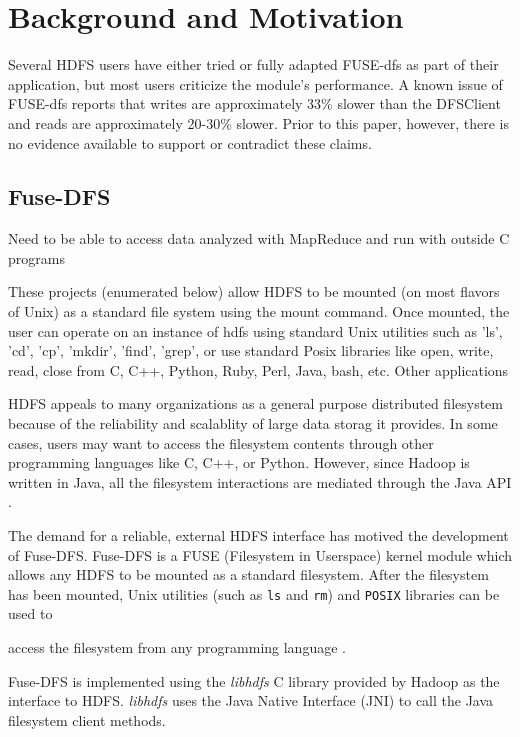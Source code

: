 \documentclass[11]{article}
\begin{document}
\section{Background and Motivation}
Several HDFS users have either tried or fully adapted FUSE-dfs as part
of their application, but most users criticize the module's performance.   
A known issue of FUSE-dfs reports that writes are approximately 33\% 
slower than the DFSClient and reads are approximately 20-30\% slower. 
Prior to this paper, however, there is no evidence available to support
or contradict these claims. 

\subsection{Fuse-DFS}
Need to be able to access data analyzed with MapReduce and run with outside C programs

These projects (enumerated below) allow HDFS to be mounted (on most flavors of Unix) as a 
standard file system using the mount command. Once mounted, the user can operate on an 
instance of hdfs using standard Unix utilities such as 'ls', 'cd', 'cp', 'mkdir', 'find', 
'grep', or use standard Posix libraries like open, write, read, close from C, C++, Python,
Ruby, Perl, Java, bash, etc.
Other applications

HDFS appeals to many organizations as a general purpose distributed
filesystem because of the reliability and scalablity of large data 
storag it provides.
In some cases, users may want to access the filesystem 
contents through other programming languages like C, C++, or Python.  
However, since Hadoop is written in Java, all the filesystem 
interactions are mediated through the Java API \cite{HadoopBook}. 

The demand for a reliable, external HDFS interface has motived the 
development of Fuse-DFS. Fuse-DFS is a FUSE (Filesystem in Userspace) 
kernel module which allows any HDFS to be mounted as a standard 
filesystem. After the filesystem has been mounted, Unix utilities (such
as \verb|ls| and \verb|rm|) and \verb|POSIX| libraries can be used to %
\topmargin=-0.45in      %
\evensidemargin=0in     %
\oddsidemargin=0in      %
\textwidth=6.5in        %
\textheight=9.0in       %
\headsep=0.25in         %

access the filesystem from any programming language \cite{HadoopBook}.

Fuse-DFS is implemented using the \textit{libhdfs} C library provided 
by Hadoop as the interface to HDFS. \textit{libhdfs} uses the Java 
Native Interface (JNI) to call the Java filesystem client methods.  
\end{document}
